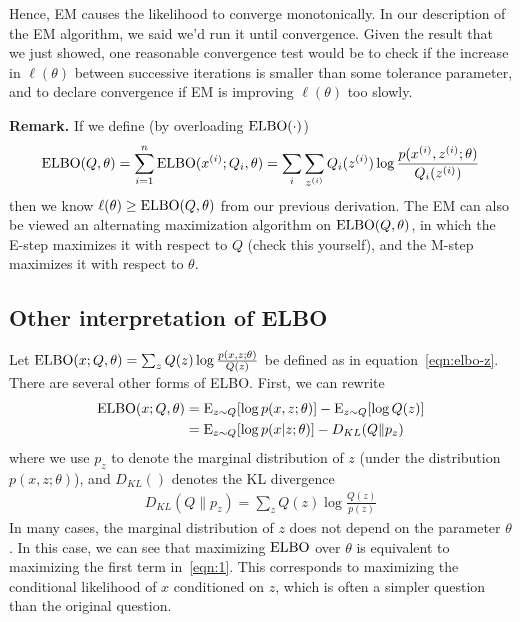 \documentclass{article}
\begin{document}
Hence, EM causes the likelihood to converge monotonically.  In our description
of the EM algorithm, we said we'd run it until convergence. Given the result
that we just showed, one reasonable convergence test would be to check if
the increase in
$\ell(\theta)$ between successive iterations is smaller than some
tolerance parameter, and to declare convergence if EM is improving
$\ell(\theta)$ too slowly.

\bigskip
\noindent
{\bf Remark.} If we define (by overloading $\textup{ELBO}(\cdot)$)
\begin{align}
\textup{ELBO}(Q, \theta) = \sum_{i=1}^{n} \textup{ELBO}({x^{(i)}}; Q_i,\theta) = \sum_i \sum_{z^{(i)}} Q_i({z^{(i)}}) \log \frac{p({x^{(i)}}, {z^{(i)}}; \theta)}{Q_i({z^{(i)}})} \label{eqn:elbo}
\end{align}
then we know $\ell(\theta) \geq \textup{ELBO}(Q, \theta)$ from our previous derivation.
The EM can also be viewed an alternating maximization algorithm on $\textup{ELBO}(Q, \theta) $, in which the E-step
maximizes it with respect to $Q$ (check this yourself), and the M-step
maximizes it with respect to $\theta$. %
\newcommand{\kl}{D_{KL}}
\subsection{Other interpretation of ELBO}

Let $\textup{ELBO}(x;Q,\theta)= \sum_{z} Q(z) \log \frac{p(x, z; \theta)}{Q(z)}$ be defined as in equation~\eqref{eqn:elbo-z}. There are several other forms of ELBO. First, we can rewrite 
\begin{align}
\elbo(x;Q,\theta) & = \E_{z \sim Q}[\log p(x,z;\theta)] -  \E_{z \sim Q}[\log Q(z)]  \nonumber\\
& =  \E_{z\sim Q}[\log p(x | z; \theta)] - \kl(Q\| p_z)\label{eqn:1}
\end{align}
where we use $p_z$ to denote the marginal distribution of $z$ (under the distribution $p(x,z;\theta)$), and $\kl()$ denotes the KL divergence 
\begin{align}
\kl(Q\| p_z) = \sum_z Q(z)\log \frac{Q(z)}{p(z)}
\end{align}
In many cases, the marginal distribution of $z$ does not depend on the parameter $\theta$. In this case, we can see that maximizing $\textup{ELBO}$ over $\theta$ is equivalent to maximizing the first term in~\eqref{eqn:1}. This corresponds to maximizing the conditional likelihood of $x$ conditioned on $z$, which is often a simpler question than the original question.  
\end{document}
